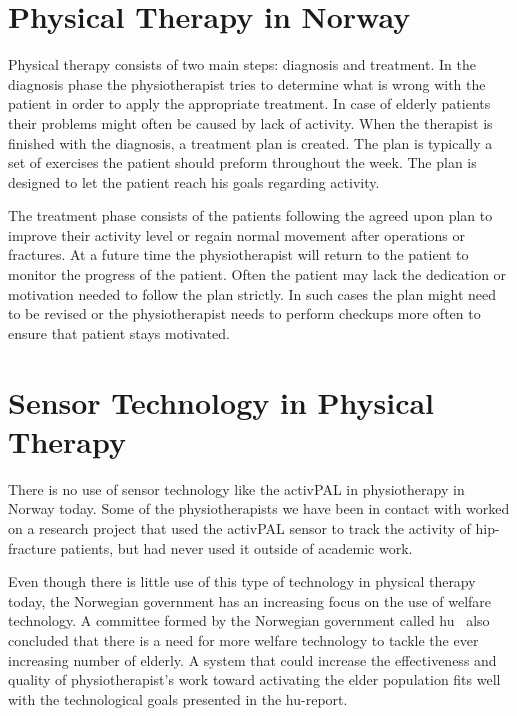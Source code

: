 \section{Physical Therapy in Norway}
Physical therapy consists of two main steps: diagnosis and treatment. In the diagnosis phase the physiotherapist tries to determine what is wrong with the patient in order to apply the appropriate treatment. In case of elderly patients their problems might often be caused by lack of activity. When the therapist is finished with the diagnosis, a treatment plan is created. The plan is typically a set of exercises the patient should preform throughout the week. The plan is designed to let the patient reach his goals regarding activity.

The treatment phase consists of the patients following the agreed upon plan to improve their activity level or regain normal movement after operations or fractures. At a future time the physiotherapist will return to the patient to monitor the progress of the patient. Often the patient may lack the dedication or motivation needed to follow the plan strictly. In such cases the plan might need to be revised or the physiotherapist needs to perform checkups more often to ensure that patient stays motivated.

\section{Sensor Technology in Physical Therapy}
There is no use of sensor technology like the activPAL in physiotherapy in Norway today. Some of the physiotherapists we have been in contact with worked on a research project that used the activPAL sensor to track the activity of hip-fracture patients, but had never used it outside of academic work.

Even though there is little use of this type of technology in physical therapy today, the Norwegian government has an increasing focus on the use of welfare technology. A committee formed by the Norwegian government called \gls{hu}~\cite{haagen} also concluded that there is a need for more welfare technology to tackle the ever increasing number of elderly. A system that could increase the effectiveness and quality of physiotherapist's work toward activating the elder population fits well with the technological goals presented in the \gls{hu}-report.  


